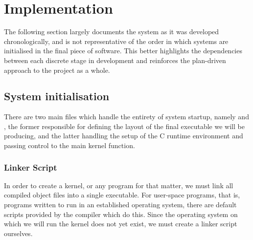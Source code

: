\section{Implementation}
    The following section largely documents the system as it was developed
    chronologically, and is not representative of the order in which systems are
    initialised in the final piece of software. This better highlights the
    dependencies between each discrete stage in development and reinforces the
    plan-driven approach to the project as a whole.

\subsection{System initialisation}
    There are two main files which handle the entirety of system startup, namely
     and , the former responsible for defining the
    layout of the final executable we will be producing, and the latter handling
    the setup of the C runtime environment and passing control to the main
    kernel function.

    \subsubsection{Linker Script}
        \label{sec:Linker}
        In order to create a kernel, or any program for that matter, we must
        link all compiled object files into a single executable. For user-space
        programs, that is, programs written to run in an established operating
        system, there are default scripts provided by the compiler which do
        this. Since the operating system on which we will run the kernel does
        not yet exist, we must create a linker script ourselves.

